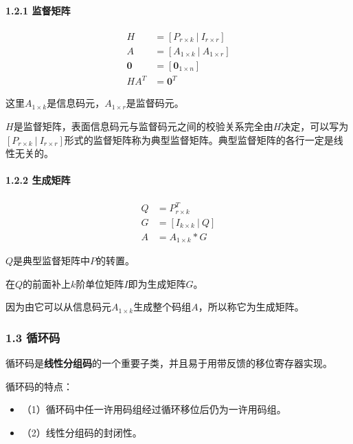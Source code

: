 \documentclass[
]{article}
\begin{document}
\hypertarget{header-n16}{%
\paragraph{1.2.1 监督矩阵}\label{header-n16}}

\begin{equation}
\begin{aligned}
H &= [P_{r \times k} \: | \: I_{r \times r}]\\
A &= [A_{1 \times k} \: | \: A_{1 \times r}]\\
\boldsymbol0 &= [\boldsymbol0_{1 \times n}]\\
HA^T &= \boldsymbol0^T 
\end{aligned}
\end{equation}

这里$A_{1 \times k}$是信息码元，$A_{1 \times r}$是监督码元。

$H$是监督矩阵，表面信息码元与监督码元之间的校验关系完全由$H$决定，可以写为$[P_{r \times k} \: | \: I_{r \times r}]$形式的监督矩阵称为典型监督矩阵。典型监督矩阵的各行一定是线性无关的。

\hypertarget{header-n20}{%
\paragraph{1.2.2 生成矩阵}\label{header-n20}}

\begin{equation}
\begin{aligned}
Q &= P_{r \times k}^T\\
G &= [I_{k \times k} \: | \: Q]\\
A &= A_{1 \times k}*G
\end{aligned}
\end{equation}

$Q$是典型监督矩阵中$P$的转置。

在$Q$的前面补上$k$阶单位矩阵$I$即为生成矩阵$G$。

因为由它可以从信息码元$A_{1 \times k}$生成整个码组$A$，所以称它为生成矩阵。

\hypertarget{header-n25}{%
\subsubsection{1.3 循环码}\label{header-n25}}

循环码是\textbf{线性分组码}的一个重要子类，并且易于用带反馈的移位寄存器实现。

循环码的特点：

\begin{itemize}
\item
  （1）循环码中任一许用码组经过循环移位后仍为一许用码组。
\item
  （2）线性分组码的封闭性。
\end{itemize}
\end{document}
